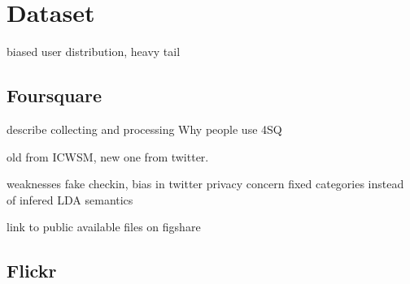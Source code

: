 \chapter{Dataset}
\label{chap:dataset}

biased user distribution\autocite{Weird10}, heavy tail

\section{Foursquare}

describe collecting and processing
Why people use 4SQ\autocite{FSMotivation11}

old from ICWSM\autocite{dataset11}, new one from twitter.

weaknesses
fake checkin\autocite{FakeCheckins12,ValidateCheckin13,FindingFake14}, bias in
twitter\autocite{TwitterBias14}
privacy concern\autocite{Privacy11}
fixed categories instead of infered LDA semantics\autocite{PlaceSemantic14}

link to public available files on figshare

\section{Flickr}



